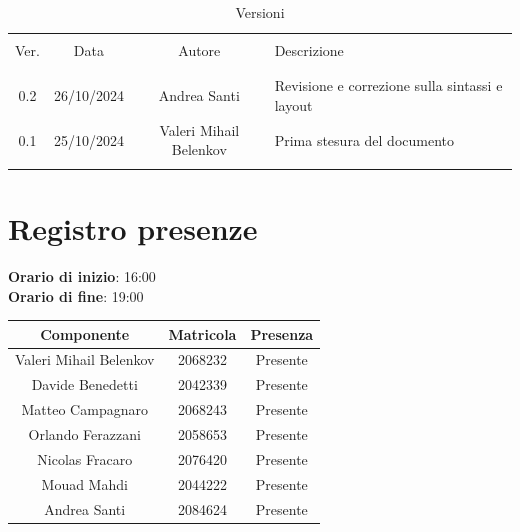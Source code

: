 \documentclass[italian, 12pt]{article}
\begin{document}
\pagestyle{mystyle}


\begin{table}[!h]
	\caption{Versioni}
	\begin{center}
		\begin{tabular}{ c c c p{9cm}}
			\hline \\[-2ex]
			Ver. & Data & Autore & Descrizione \\
			\\[-2ex] \hline \\[-1.5ex]
            0.2 & 26/10/2024 & Andrea Santi & Revisione e correzione sulla sintassi e layout \\
			0.1 & 25/10/2024 & Valeri Mihail Belenkov& Prima stesura del documento\\
			\\[-1.5ex] \hline
		\end{tabular}
	\end{center}
\end{table}


\tableofcontents
\newpage


\section{Registro presenze}

\textbf{Orario di inizio}: 16:00\\
\textbf{Orario di fine}: 19:00\\


\begin{flushleft}
	\begin{table}[!h]
	\begin{tabular}{ |c|c|c| } 
		\hline
		\textbf{Componente} & \textbf{Matricola} & \textbf{Presenza} \\
  \hline 
		Valeri Mihail Belenkov & 2068232 & Presente \\
		Davide Benedetti 	& 2042339 & Presente \\
		Matteo Campagnaro	& 2068243 & Presente \\
		Orlando Ferazzani 	& 2058653 & Presente \\
		Nicolas Fracaro 	& 2076420 & Presente \\
		Mouad Mahdi		    & 2044222 & Presente \\ 
		Andrea Santi 	    & 2084624 & Presente \\
		\hline
	\end{tabular}
	\end{table}
	\end{flushleft}
\end{document}
